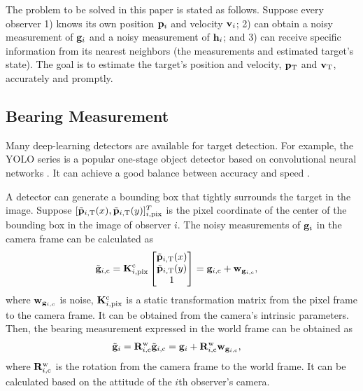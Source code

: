 \documentclass[letterpaper, 10 pt, conference]{ieeeconf}  %
\begin{document}
The problem to be solved in this paper is stated as follows. Suppose every observer 1) knows its own position $\mathbf{p}_i$ and velocity $\mathbf{v}_i$; 2) can obtain a noisy measurement of $\mathbf{g}_i$ and a noisy measurement of $\mathbf{h}_i$; and 3) can receive specific information from its nearest neighbors (the measurements and estimated target's state). The goal is to estimate the target's position and velocity, $\mathbf{p}_{{\rm T}}$ and $\mathbf{v}_{{\rm T}}$, accurately and promptly.

\subsection{Bearing Measurement}\label{sub_g}

Many deep-learning detectors are available for target detection. For example, the YOLO series is a popular one-stage object detector based on convolutional neural networks \cite{redmon2018yolov3, bochkovskiy2020yolov4}. It can achieve a good balance between accuracy and speed \cite{2021Air, wu2020using, isaac2021unmanned}.

A detector can generate a bounding box that tightly surrounds the target in the image.
Suppose $[\tilde{\mathbf{p}}_{i,{\rm T}}(x),\tilde{\mathbf{p}}_{i,{\rm T}}(y)]^T_{i, {\rm pix}}$ is the pixel coordinate of the center of the bounding box in the image of observer $i$.
The noisy measurements of $\mathbf{g}_i$ in the camera frame can be calculated as
\begin{align}
\tilde{\mathbf{g}}_{i, {\rm c}} & =	\mathbf{K}^{\rm c}_{i, {\rm pix}}\begin{bmatrix}
\tilde{\mathbf{p}}_{i,{\rm T}}(x)\\ \tilde{\mathbf{p}}_{i,{\rm T}}(y) \\ 1
\end{bmatrix} = \mathbf{g}_{i, {\rm c}} + \mathbf{w}_{\mathbf{g}_{i, {\rm c}}},
\end{align}
where $\mathbf{w}_{\mathbf{g}_{i,c}}$ is noise, $\mathbf{K}^{\rm c}_{i, {\rm pix}}$ is a static transformation matrix from the pixel frame to the camera frame. It can be obtained from the camera's intrinsic parameters.
Then, the bearing measurement expressed in the world frame can be obtained as
\begin{align}\label{eq_rel_cam2world_g}
\tilde{\mathbf{g}}_i &= \mathbf{R}_{i, {\rm c}}^{\rm w}\tilde{\mathbf{g}}_{i, {\rm c}}= \mathbf{g}_i +\mathbf{R}_{i, {\rm c}}^{\rm w}\mathbf{w}_{\mathbf{g}_{i, {\rm c}}},
\end{align}
where $\mathbf{R}_{i, {\rm c}}^{\rm w}$ is the rotation from the camera frame to the world frame. It can be calculated based on the attitude of the $i$th observer's camera.
\end{document}
